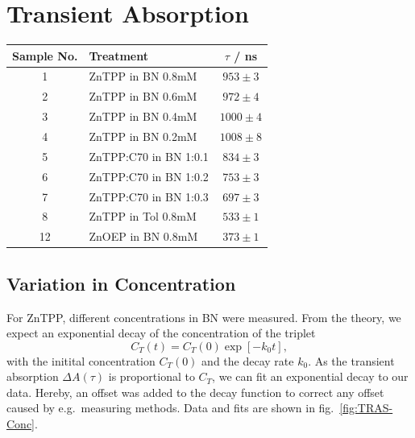 \section{Transient Absorption}
\label{sec:TRAS}


\begin{table}[ht]
    \centering
    \begin{tabular}{clc}
        \toprule
        Sample No. &    Treatment &    $\tau$ / \si{\nano\second} \\
        \midrule
        1 &     ZnTPP in BN 0.8mM &  $953 \pm 3$ \\
        2 &     ZnTPP in BN 0.6mM &  $972 \pm 4$ \\
        3 &     ZnTPP in BN 0.4mM & $1000 \pm 4$ \\
        4 &     ZnTPP in BN 0.2mM & $1008 \pm 8$ \\
        5 & ZnTPP:C70 in BN 1:0.1 &  $834 \pm 3$ \\
        6 & ZnTPP:C70 in BN 1:0.2 &  $753 \pm 3$ \\
        7 & ZnTPP:C70 in BN 1:0.3 &  $697 \pm 3$ \\
        8 &    ZnTPP in Tol 0.8mM &  $533 \pm 1$ \\
        12 &     ZnOEP in BN 0.8mM &  $373 \pm 1$\\
        \bottomrule
    \end{tabular}
\end{table}



\subsection*{Variation in Concentration}
For ZnTPP, different concentrations in BN were measured. From the theory, we expect an exponential decay of the concentration of the triplet 
\begin{equation}
    C_T(t) = C_T(0) \exp[-k_0t],
\end{equation}
with the initital concentration $C_T(0)$ and the decay rate $k_0$.
As the transient absorption $\Delta A(\tau)$ is proportional to $C_T$, we can fit an exponential decay to our data. Hereby, an offset was added to the decay function to correct any offset caused by e.g.~measuring methods. Data and fits are shown in fig.~\ref{fig:TRAS-Conc}.

